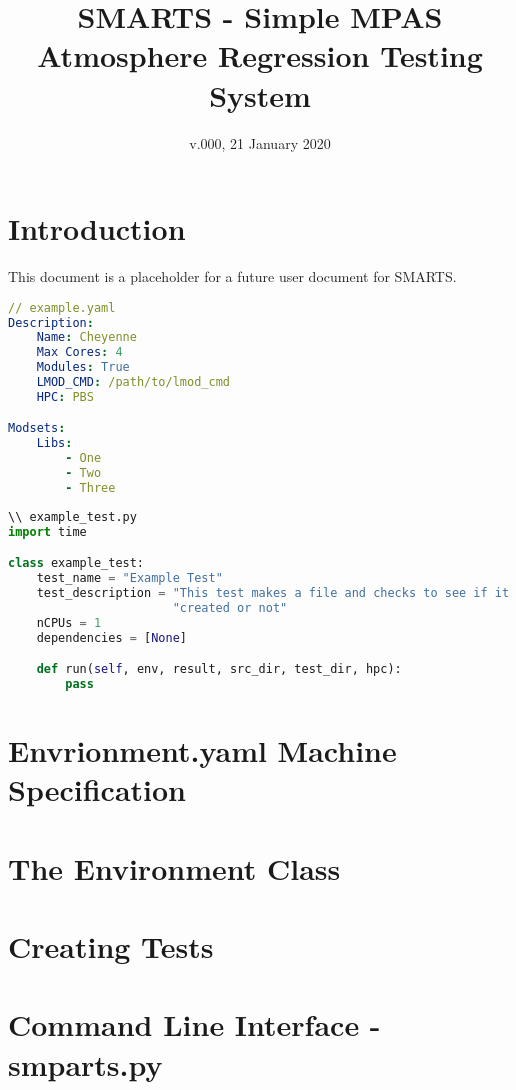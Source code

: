 \documentclass[11pt]{report}
\begin{document}
\title{SMARTS - Simple MPAS Atmosphere Regression Testing System}
\date{v.000, 21 January 2020}

\maketitle

\chapter{Introduction}
\label{chap:intro}

This document is a placeholder for a future user document for SMARTS.

\begin{lstlisting}[language=yaml]
// example.yaml
Description:
    Name: Cheyenne
    Max Cores: 4
    Modules: True
    LMOD_CMD: /path/to/lmod_cmd
    HPC: PBS

Modsets:
    Libs:
        - One
        - Two
        - Three
\end{lstlisting}

\begin{lstlisting}[language=Python]
\\ example_test.py
import time

class example_test:
    test_name = "Example Test"
    test_description = "This test makes a file and checks to see if it was" \
                       "created or not"
    nCPUs = 1
    dependencies = [None]

    def run(self, env, result, src_dir, test_dir, hpc):
        pass

\end{lstlisting}


\chapter{Envrionment.yaml Machine Specification}

\chapter{The Environment Class}

\chapter{Creating Tests}

\chapter{Command Line Interface - smparts.py}
\end{document}
